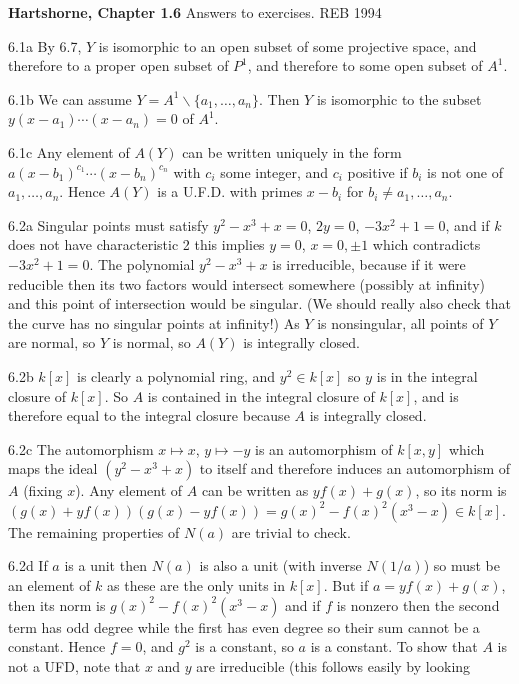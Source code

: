 \def\Z{{\bf Z}}
{\bf Hartshorne, Chapter 1.6} Answers to exercises. \hfill REB 1994
\item{6.1a} By 6.7, $Y$ is isomorphic to an open subset of some
projective space, and therefore to a proper open subset of $P^1$, and
therefore to some open subset of $A^1$.
\item{6.1b} We can assume $Y=A^1\backslash \{a_1,\ldots,a_n\}$.
Then $Y$ is isomorphic to the subset 
$y(x-a_1)\cdots(x-a_n)=0$ of $A^1$. 
\item{6.1c} Any element of $A(Y)$ can be written uniquely 
in the form $a(x-b_1)^{c_1}\cdots (x-b_n)^{c_n}$
with $c_i$ some integer, and $c_i$ positive if $b_i$
is not one of $a_1,\ldots, a_n$. Hence $A(Y)$ is
a U.F.D. with primes $x-b_i$ for $b_i\ne a_1,\ldots,a_n$. 
\item{6.2a} Singular points must satisfy 
$y^2-x^3+x=0$, $2y=0$, $-3x^2+1=0$, and if $k$ does not have characteristic
2 this implies $y=0$, $x=0,\pm 1$ which contradicts
$-3x^2+1=0$. The polynomial $y^2-x^3+x$ is irreducible,
because if it were reducible then its two factors
would intersect somewhere (possibly at infinity) 
and this point of intersection would be singular. (We should really 
also check that the curve has no singular points at infinity!)
As $Y$ is nonsingular, all points of $Y$ are normal, 
so $Y$ is normal, so $A(Y)$ is integrally closed. 
\item{6.2b} $k[x]$ is clearly a polynomial ring, 
and $y^2\in k[x]$ so $y$ is in the integral closure of 
$k[x]$. So $A$ is contained in  the integral closure of
$k[x]$, and is therefore equal to the integral closure
because $A$ is integrally closed. 
\item{6.2c} The automorphism $x\mapsto x$, $y\mapsto -y$
is an automorphism of $k[x,y]$ which maps the ideal
$(y^2-x^3+x)$ to itself and therefore induces an automorphism 
of $A$ (fixing $x$). Any element of $A$ can be written as
$yf(x)+g(x)$, so its norm is $(g(x)+yf(x))(g(x)-yf(x))
=g(x)^2-f(x)^2(x^3-x)\in k[x]$. The remaining properties
of $N(a)$ are trivial to check. 
\item{6.2d} If $a$ is a unit then $N(a)$ is also 
a unit (with inverse $N(1/a)$) so must be an element of $k$
as these are the only units in $k[x]$. 
But if $a=yf(x)+g(x)$, then its norm is
$g(x)^2-f(x)^2(x^3-x)$ and if $f$ is nonzero 
then the second term has odd degree while the first has
even degree so their sum cannot be a constant. Hence $f=0$,
and $g^2$ is a constant, so $a$ is a constant. 
To show that $A$ is not a UFD, note that $x$ and $y$
are irreducible (this follows easily by looking
